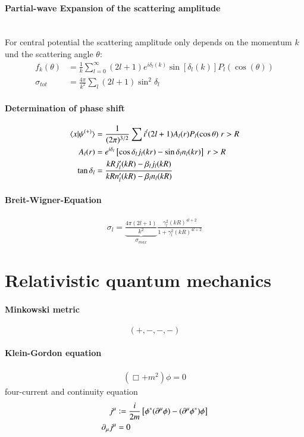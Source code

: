 \paragraph{Partial-wave Expansion of the scattering amplitude} \hspace{0pt} \\
For central potential the scattering amplitude only depends on the momentum $k$ und the scattering angle $\theta$:
\begin{align}
	f_k(\theta) &= \frac{1}{k} \sum_{l=0}^\infty (2l+1) e^{i \delta_l (k)} \sin{[\delta_l(k)]} P_l (\cos(\theta)) \\
	\sigma_{tot} &= \frac{4\pi}{k^2}\sum_l (2l+1)\sin^2{\delta_l}
\end{align}
\paragraph{Determination of phase shift}
\begin{align}
	\braket{x | \psi^{(+)}} &= \frac{1}{(2\pi)^{3/2}} \sum i^l (2l+1) A_l(r) P_l(\cos{\theta}) \; r>R \\
	A_l(r) &= e^{i\delta_l} \left[ \cos{\delta_l} j_l(kr) - \sin{\delta_l}n_l(kr) \right] \; r>R\\
	\tan{\delta_l} &= \frac{kRj_l'(kR) - \beta_l j_l(kR)}{kRn'_l(kR) - \beta_l n_l(kR)}
\end{align}

\paragraph{Breit-Wigner-Equation}
\begin{align}
\sigma_l = \underbrace{\frac{4\pi(2l+1)}{k^2}}_{\sigma_{max}} \frac{\gamma_l^2 (kR)^{4l+2}}{1+\gamma_l^2(kR)^{4l+2}}
\end{align}
\section{Relativistic quantum mechanics}
\paragraph{Minkowski metric}
$$(+,-,-,-)$$
\paragraph{Klein-Gordon equation}
\begin{align}
	(\Box + m^2)\phi = 0
\end{align}
four-current and continuity equation
\begin{align}
	j^\mu &\vcentcolon = \frac{i}{2m} \left[ \phi^*(\partial^\mu \phi) - (\partial^\mu \phi^*)\phi \right] \\
	\partial_\mu j^\mu &= 0 
\end{align}

